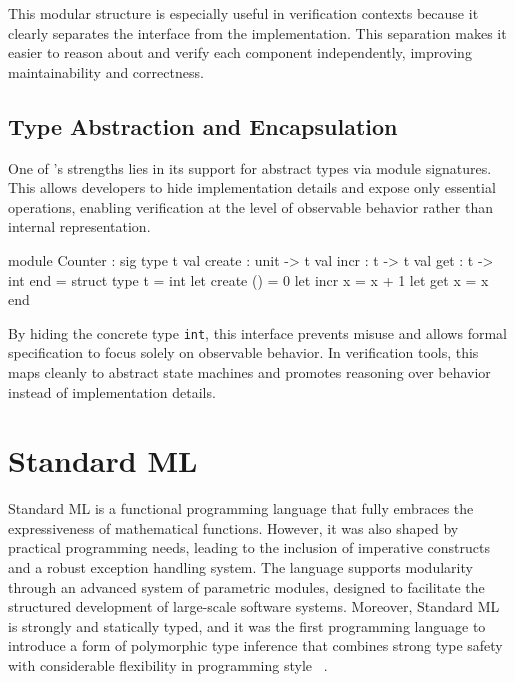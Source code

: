 This modular structure is especially useful in verification contexts because it clearly separates the interface from the 
implementation. This separation makes it easier to reason about and verify each component independently, improving 
maintainability and correctness.

\subsection{Type Abstraction and Encapsulation}

One of \ocaml's strengths lies in its support for abstract types via module signatures. This allows developers to hide 
implementation details and expose only essential operations, enabling verification at the level of observable behavior rather 
than internal representation.

\begin{ocamlenv}
  module Counter : sig
    type t
    val create : unit -> t
    val incr : t -> t
    val get : t -> int
  end = struct
    type t = int
    let create () = 0
    let incr x = x + 1
    let get x = x
  end
\end{ocamlenv}

By hiding the concrete type \texttt{int}, this interface prevents misuse and allows formal specification to focus solely on 
observable behavior. In verification tools, this maps cleanly to abstract state machines and promotes reasoning over 
behavior instead of implementation details.



\section{Standard ML}
\label{sec:Standard_ML}

Standard ML is a functional programming language that fully embraces the expressiveness of mathematical functions. 
However, it was also shaped by practical programming needs, leading to the inclusion of imperative constructs and a 
robust exception handling system. The language supports modularity through an advanced system of parametric modules, 
designed to facilitate the structured development of large-scale software systems. Moreover, Standard ML is strongly 
and statically typed, and it was the first programming language to introduce a form of polymorphic type inference that 
combines strong type safety with considerable flexibility in programming style ~\cite{milner1997definition}.

